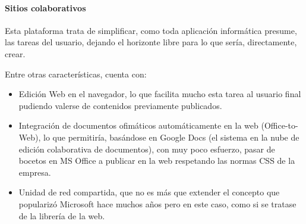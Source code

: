 \paragraph{Sitios colaborativos} 
\par Esta plataforma trata de simplificar, como toda aplicación informática presume, las tareas del usuario, dejando el horizonte libre para lo que sería, directamente, crear.
\par Entre otras características, cuenta con:
\begin{itemize}
 \item Edición Web en el navegador, lo que facilita mucho esta tarea al usuario final pudiendo valerse de contenidos previamente publicados.
 \item Integración de documentos ofimáticos automáticamente en la web (Office-to-Web), lo que permitiría, basándose en Google Docs (el sistema en la nube de edición colaborativa de documentos), con muy poco esfuerzo, pasar de bocetos en MS Office a publicar en la web respetando las normas CSS de la empresa.
 \item Unidad de red compartida, que no es más que extender el concepto que popularizó Microsoft hace muchos años pero en este caso, como si se tratase de la librería de la web.
\end{itemize}